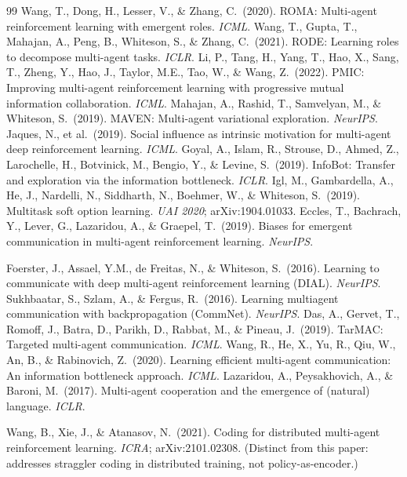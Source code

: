 \documentclass[10pt, letterpaper]{article}
\begin{document}
\begin{thebibliography}{99}
 Wang, T., Dong, H., Lesser, V., \& Zhang, C.\ (2020). ROMA: Multi-agent reinforcement learning with emergent roles. \emph{ICML}.
 Wang, T., Gupta, T., Mahajan, A., Peng, B., Whiteson, S., \& Zhang, C.\ (2021). RODE: Learning roles to decompose multi-agent tasks. \emph{ICLR}.
 Li, P., Tang, H., Yang, T., Hao, X., Sang, T., Zheng, Y., Hao, J., Taylor, M.E., Tao, W., \& Wang, Z.\ (2022). PMIC: Improving multi-agent reinforcement learning with progressive mutual information collaboration. \emph{ICML}.
 Mahajan, A., Rashid, T., Samvelyan, M., \& Whiteson, S.\ (2019). MAVEN: Multi-agent variational exploration. \emph{NeurIPS}.
 Jaques, N., et al.\ (2019). Social influence as intrinsic motivation for multi-agent deep reinforcement learning. \emph{ICML}.
 Goyal, A., Islam, R., Strouse, D., Ahmed, Z., Larochelle, H., Botvinick, M., Bengio, Y., \& Levine, S.\ (2019). InfoBot: Transfer and exploration via the information bottleneck. \emph{ICLR}.
 Igl, M., Gambardella, A., He, J., Nardelli, N., Siddharth, N., Boehmer, W., \& Whiteson, S.\ (2019). Multitask soft option learning. \emph{UAI 2020}; arXiv:1904.01033.
 Eccles, T., Bachrach, Y., Lever, G., Lazaridou, A., \& Graepel, T.\ (2019). Biases for emergent communication in multi-agent reinforcement learning. \emph{NeurIPS}.

 Foerster, J., Assael, Y.M., de Freitas, N., \& Whiteson, S.\ (2016). Learning to communicate with deep multi-agent reinforcement learning (DIAL). \emph{NeurIPS}.
 Sukhbaatar, S., Szlam, A., \& Fergus, R.\ (2016). Learning multiagent communication with backpropagation (CommNet). \emph{NeurIPS}.
 Das, A., Gervet, T., Romoff, J., Batra, D., Parikh, D., Rabbat, M., \& Pineau, J.\ (2019). TarMAC: Targeted multi-agent communication. \emph{ICML}.
 Wang, R., He, X., Yu, R., Qiu, W., An, B., \& Rabinovich, Z.\ (2020). Learning efficient multi-agent communication: An information bottleneck approach. \emph{ICML}.
 Lazaridou, A., Peysakhovich, A., \& Baroni, M.\ (2017). Multi-agent cooperation and the emergence of (natural) language. \emph{ICLR}.

 Wang, B., Xie, J., \& Atanasov, N.\ (2021). Coding for distributed multi-agent reinforcement learning. \emph{ICRA}; arXiv:2101.02308. (Distinct from this paper: addresses straggler coding in distributed training, not policy-as-encoder.)


\end{thebibliography}
\end{document}
